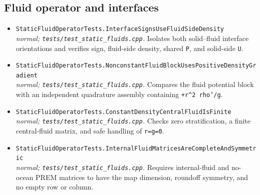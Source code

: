 \subsection*{Fluid operator and interfaces}
\begin{itemize}[leftmargin=1.4em,itemsep=0.35em]
\item {\footnotesize\texttt{StaticFluidOperatorTests.InterfaceSignsUseFluidSideDensity}}\\
\emph{normal; \texttt{tests/test\_static\_fluids.cpp}.} Isolates both solid--fluid interface orientations and verifies sign, fluid-side density, shared \texttt{P}, and solid-side \texttt{U}.
\item {\footnotesize\texttt{StaticFluidOperatorTests.NonconstantFluidBlockUsesPositiveDensityGradient}}\\
\emph{normal; \texttt{tests/test\_static\_fluids.cpp}.} Compares the fluid potential block with an independent quadrature assembly containing \texttt{+r\textasciicircum{}2 rho'/g}.
\item {\footnotesize\texttt{StaticFluidOperatorTests.ConstantDensityCentralFluidIsFinite}}\\
\emph{normal; \texttt{tests/test\_static\_fluids.cpp}.} Checks zero stratification, a finite central-fluid matrix, and safe handling of \texttt{r=g=0}.
\item {\footnotesize\texttt{StaticFluidOperatorTests.InternalFluidMatricesAreCompleteAndSymmetric}}\\
\emph{normal; \texttt{tests/test\_static\_fluids.cpp}.} Requires internal-fluid and no-ocean PREM matrices to have the map dimension, roundoff symmetry, and no empty row or column.
\end{itemize}
